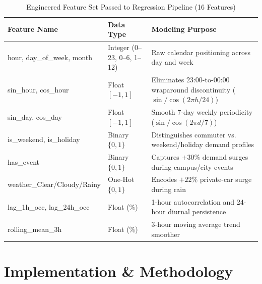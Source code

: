 \documentclass[12pt,a4paper,oneside]{report}
\begin{document}
\begin{table}[H]
\centering
\caption{Engineered Feature Set Passed to Regression Pipeline (16 Features)}
\label{tab:features}
\small
\begin{tabularx}{\textwidth}{>{\ttfamily}p{4.0cm} p{3.2cm} X}
\toprule
\textbf{Feature Name} & \textbf{Data Type} & \textbf{Modeling Purpose} \\
\midrule
hour, day\_of\_week, month & Integer (0--23, 0--6, 1--12) & Raw calendar positioning across day and week \\
sin\_hour, cos\_hour & Float $[-1, 1]$ & Eliminates 23:00-to-00:00 wraparound discontinuity ($\sin/\cos(2\pi h/24)$) \\
sin\_day, cos\_day & Float $[-1, 1]$ & Smooth 7-day weekly periodicity ($\sin/\cos(2\pi d/7)$) \\
is\_weekend, is\_holiday & Binary $\{0,1\}$ & Distinguishes commuter vs. weekend/holiday demand profiles \\
has\_event & Binary $\{0,1\}$ & Captures $+30\%$ demand surges during campus/city events \\
weather\_Clear/Cloudy/Rainy & One-Hot $\{0,1\}$ & Encodes $+22\%$ private-car surge during rain \\
lag\_1h\_occ, lag\_24h\_occ & Float (\%) & 1-hour autocorrelation and 24-hour diurnal persistence \\
rolling\_mean\_3h & Float (\%) & 3-hour moving average trend smoother \\
\bottomrule
\end{tabularx}
\end{table}

\chapter{Implementation \& Methodology}
\end{document}
